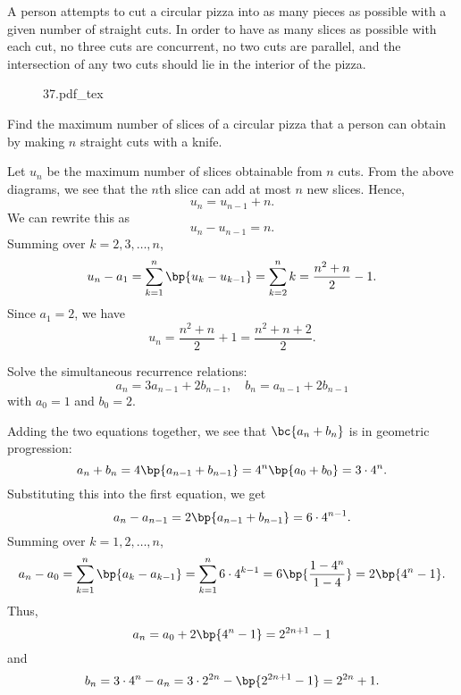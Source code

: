 \begin{problem}[\chili]
    A person attempts to cut a circular pizza into as many pieces as possible with a given number of straight cuts. In order to have as many slices as possible with each cut, no three cuts are concurrent, no two cuts are parallel, and the intersection of any two cuts should lie in the interior of the pizza. 
    
    \begin{figure}[H]
        \centering
        {37.pdf_tex}
    \end{figure}

    Find the maximum number of slices of a circular pizza that a person can obtain by making $n$ straight cuts with a knife.
\end{problem}
\begin{solution}
    Let $u_n$ be the maximum number of slices obtainable from $n$ cuts. From the above diagrams, we see that the $n$th slice can add at most $n$ new slices. Hence, \[u_n = u_{n-1} + n.\] We can rewrite this as \[u_n - u_{n-1} = n.\] Summing over $k = 2, 3, \dots, n$, \[u_n - a_1 = \sum_{k = 1}^n \bp{u_k - u_{k-1}} = \sum_{k = 2}^n k = \frac{n^2 + n}{2} - 1.\] Since $a_1 = 2$, we have \[u_n = \frac{n^2 + n}{2} + 1 = \frac{n^2 + n + 2}{2}.\]
\end{solution}

\begin{problem}[\chili]
    Solve the simultaneous recurrence relations: \[a_n = 3a_{n-1} + 2b_{n-1}, \quad b_n = a_{n-1} + 2b_{n-1}\] with $a_0 = 1$ and $b_0 = 2$.
\end{problem}
\begin{solution}
    Adding the two equations together, we see that $\bc{a_n + b_n}$ is in geometric progression: \[a_n + b_n = 4\bp{a_{n-1} + b_{n-1}} = 4^n \bp{a_0 + b_0} = 3 \cdot 4^n.\] Substituting this into the first equation, we get \[a_n - a_{n-1} = 2\bp{a_{n-1} + b_{n-1}} = 6 \cdot 4^{n-1}.\] Summing over $k = 1, 2, \dots, n$, \[a_n - a_0 = \sum_{k = 1}^{n} \bp{a_k - a_{k-1}} = \sum_{k = 1}^n 6 \cdot 4^{k-1} = 6 \bp{\frac{1 - 4^n}{1 - 4}} = 2\bp{4^n - 1}.\] Thus, \[a_n = a_0 + 2\bp{4^n - 1} = 2^{2n+1} - 1\] and \[b_n = 3\cdot4^n - a_n = 3\cdot 2^{2n} - \bp{2^{2n+1} - 1} = 2^{2n} + 1.\]
\end{solution}